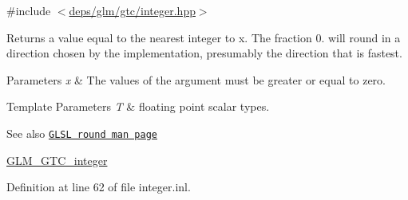 {\ttfamily \#include $<$\hyperlink{gtc_2integer_8hpp}{deps/glm/gtc/integer.\+hpp}$>$}

Returns a value equal to the nearest integer to x. The fraction 0. will round in a direction chosen by the implementation, presumably the direction that is fastest.


\begin{DoxyParams}{Parameters}
{\em x} & The values of the argument must be greater or equal to zero. \\
\hline
\end{DoxyParams}

\begin{DoxyTemplParams}{Template Parameters}
{\em T} & floating point scalar types.\\
\hline
\end{DoxyTemplParams}
\begin{DoxySeeAlso}{See also}
\href{http://www.opengl.org/sdk/docs/manglsl/xhtml/round.xml}{\tt G\+L\+SL round man page} 

\hyperlink{group__gtc__integer}{G\+L\+M\+\_\+\+G\+T\+C\+\_\+integer} 
\end{DoxySeeAlso}


Definition at line 62 of file integer.\+inl.

